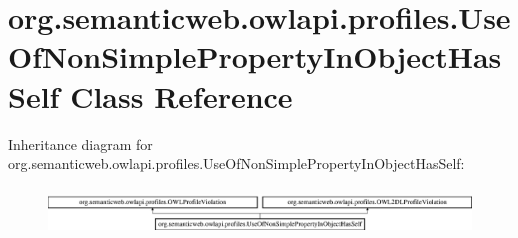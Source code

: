 \hypertarget{classorg_1_1semanticweb_1_1owlapi_1_1profiles_1_1_use_of_non_simple_property_in_object_has_self}{\section{org.\-semanticweb.\-owlapi.\-profiles.\-Use\-Of\-Non\-Simple\-Property\-In\-Object\-Has\-Self Class Reference}
\label{classorg_1_1semanticweb_1_1owlapi_1_1profiles_1_1_use_of_non_simple_property_in_object_has_self}
}
Inheritance diagram for org.\-semanticweb.\-owlapi.\-profiles.\-Use\-Of\-Non\-Simple\-Property\-In\-Object\-Has\-Self\-:\begin{figure}[H]
\begin{center}
\leavevmode
\includegraphics[height=1.272727cm]{classorg_1_1semanticweb_1_1owlapi_1_1profiles_1_1_use_of_non_simple_property_in_object_has_self}
\end{center}
\end{figure}

